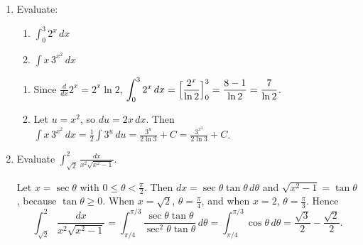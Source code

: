 \documentclass[12pt,letterpaper]{article}
\begin{document}
\begin{enumerate}[label=\textbf{\arabic*.},leftmargin=2em,itemsep=1.25em]
    \begin{solution}
      Integrate by parts with $u=\ln x$ and $dv=x^2\,dx$, so
      $du=\frac{dx}{x}$ and $v=\frac{x^3}{3}$:
      \[
        \int_1^e x^2\ln x\,dx=\Bigl[\frac{x^3}{3}\ln x\Bigr]_1^e
          -\int_1^e\frac{x^2}{3}\,dx
        =\frac{e^3}{3}-\Bigl[\frac{x^3}{9}\Bigr]_1^e
        =\frac{e^3}{3}-\frac{e^3-1}{9}=\frac{2e^3+1}{9}.
      \]
    \end{solution}

  \item Evaluate:
    \begin{enumerate}[label=(\alph*)]
      \item $\displaystyle\int_0^3 2^x\,dx$
      \item $\displaystyle\int x\,3^{x^2}\,dx$
    \end{enumerate}

    \begin{solution}
      \begin{enumerate}[label=(\alph*)]
        \item Since $\frac{d}{dx}2^x=2^x\ln2$,
          $\displaystyle\int_0^3 2^x\,dx=\Bigl[\frac{2^x}{\ln2}\Bigr]_0^3
          =\frac{8-1}{\ln2}=\frac{7}{\ln2}$.
        \item Let $u=x^2$, so $du=2x\,dx$. Then
          $\displaystyle\int x\,3^{x^2}\,dx=\frac12\int3^u\,du
          =\frac{3^u}{2\ln3}+C=\frac{3^{x^2}}{2\ln3}+C$.
      \end{enumerate}
    \end{solution}

  \item Evaluate
    $\displaystyle\int_{\sqrt2}^2\frac{dx}{x^2\sqrt{x^2-1}}$.

    \begin{solution}
      Let $x=\sec\theta$ with $0\le\theta<\frac\pi2$. Then
      $dx=\sec\theta\tan\theta\,d\theta$ and $\sqrt{x^2-1}=\tan\theta$,
      because $\tan\theta\ge0$. When $x=\sqrt2$, $\theta=\frac\pi4$, and when
      $x=2$, $\theta=\frac\pi3$. Hence
      \[
        \int_{\sqrt2}^2\frac{dx}{x^2\sqrt{x^2-1}}
        =\int_{\pi/4}^{\pi/3}\frac{\sec\theta\tan\theta}{\sec^2\theta\tan\theta}
          \,d\theta
        =\int_{\pi/4}^{\pi/3}\cos\theta\,d\theta
        =\frac{\sqrt3}{2}-\frac{\sqrt2}{2}.
      \]
    \end{solution}
\end{enumerate}
\end{document}
